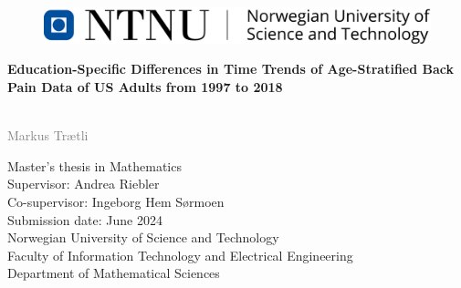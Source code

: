 \newcommand\myemptypage{
    \null
    \thispagestyle{empty}
    \addtocounter{page}{-1}
    \newpage
    } %

\begin{titlepage}
    \begin{figure}[h]
        \includegraphics[width=\textwidth]{Figures/NTNU-Bred.pdf}
    \end{figure}
    \vspace*{1.5cm}
    
    \noindent \textbf{\LARGE Education-Specific Differences in Time Trends of Age-Stratified Back Pain Data of US Adults from 1997 to 2018} \\

    \vspace*{-0.4cm}
     \\
    \vspace{0.5cm}

    \noindent  \textcolor{gray}{\Large Markus Trætli} \\
    \vspace{0.5cm}
    
    
    \vspace{1.5cm}%
    \noindent Master's thesis in Mathematics \\
    Supervisor: Andrea Riebler \\
    Co-supervisor: Ingeborg Hem Sørmoen \\
    Submission date: June 2024 \\
    
    \vspace{0.2cm}
    \noindent Norwegian University of Science and Technology \\
    Faculty of Information Technology and Electrical Engineering \\
    Department of Mathematical Sciences \\
\end{titlepage}
\restoregeometry
\myemptypage %

